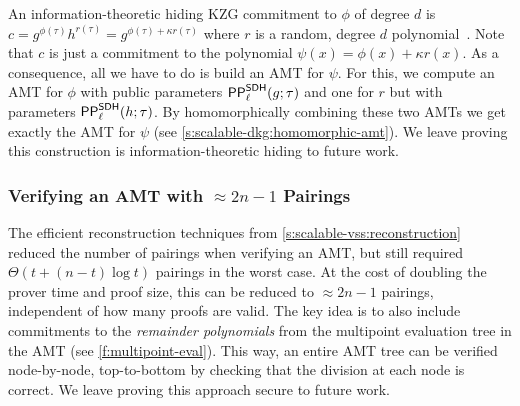 An information-theoretic hiding KZG commitment to $\phi$ of degree $d$ is $c = g^{\phi(\tau)} h^{r(\tau)} = g^{\phi(\tau)+\kappa r(\tau)}$ where $r$ is a random, degree $d$ polynomial~\cite{KZG10a}.
Note that $c$ is just a commitment to the polynomial $\psi(x) = \phi(x) + \kappa r(x)$.
As a consequence, all we have to do is build an AMT for $\psi$.
For this, we compute an AMT for $\phi$ with public parameters $\mathsf{PP}^\mathsf{SDH}_\ell(g;\tau)$ and one for $r$ but with parameters $\mathsf{PP}^\mathsf{SDH}_\ell(h;\tau)$.
By homomorphically combining these two AMTs we get exactly the AMT for $\psi$ (see \cref{s:scalable-dkg:homomorphic-amt}).
We leave proving this construction is information-theoretic hiding to future work.


\subsubsection{Verifying an AMT with $\approx 2n-1$ Pairings}
\label{s:amt:batch-verification}
The efficient reconstruction techniques from \cref{s:scalable-vss:reconstruction} reduced the number of pairings when verifying an AMT, but still required $\Theta(t + (n-t)\log{t})$ pairings in the worst case.
At the cost of doubling the prover time and proof size, this can be reduced to $\approx 2n-1$ pairings, independent of how many proofs are valid.
The key idea is to also include commitments to the \textit{remainder polynomials} from the multipoint evaluation tree in the AMT (see \cref{f:multipoint-eval}).
This way, an entire AMT tree can be verified node-by-node, top-to-bottom by checking that the division at each node is correct.
We leave proving this approach secure to future work.
